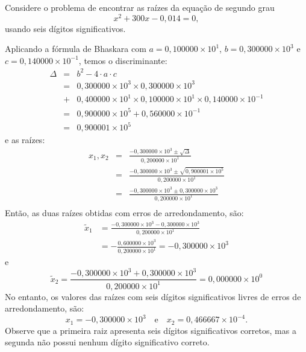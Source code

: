 \begin{ex} Considere o problema de encontrar as raízes da equação de segundo grau
  \begin{equation}
    x^2+300x-0,014=0,
  \end{equation}
usando seis dígitos significativos.

Aplicando a fórmula de Bhaskara com $a=0,100000\times 10^1$, $b=0,300000\times 10^3$ e $c=0,140000\times 10^{-1}$, temos o discriminante:
\begin{eqnarray}
  \Delta &=& b^2 - 4\cdot a\cdot c\\
  &=&0,300000\times 10^3\times 0,300000\times 10^3 \\
  &+& 0,400000\times 10^1\times 0,100000\times 10^1\times 0,140000\times 10^{-1}\\
  &=&0,900000\times 10^5 +0,560000\times  10^{-1}\\
  &=&0,900001\times 10^5
\end{eqnarray}
e as raízes:
\begin{eqnarray}
x_1,x_2 &=& \frac{-0,300000\times 10^3\pm \sqrt{\Delta}}{0,200000\times 10^1} \\
&=& \frac{-0,300000\times 10^3\pm \sqrt{0,900001\times 10^5}}{0,200000\times 10^1} \\
&=& \frac{-0,300000\times 10^3\pm 0,300000\times 10^3}{0,200000\times 10^1}\\
\end{eqnarray}
Então, as duas raízes obtidas com erros de arredondamento, são:
\begin{equation}
  \begin{split}
  \tilde{x}_1 &= \frac{-0,300000\times 10^3- 0,300000\times 10^3}{0,200000\times 10^1}\\
  &=-\frac{0,600000\times 10^3}{0,200000\times 10^1}=-0,300000\times 10^3
  \end{split}
\end{equation}
e
\begin{equation}
\tilde{x}_2=\frac{-0,300000\times 10^3+ 0,300000\times 10^3}{0,200000\times 10^1}=0,000000\times 10^{0}
\end{equation}
No entanto, os valores das raízes com seis dígitos significativos livres de erros de arredondamento, são:
\begin{equation}
  x_1=-0,300000\times 10^{3}\quad\text{e}\quad x_2=0,466667\times 10^{-4}.
\end{equation}
Observe que a primeira raiz apresenta seis dígitos significativos corretos, mas a segunda não possui nenhum dígito significativo correto.



\end{ex}
